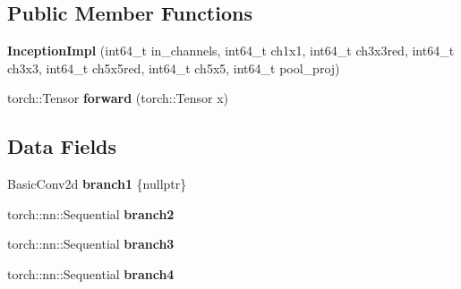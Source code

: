 \subsection*{Public Member Functions}
\begin{DoxyCompactItemize}
\item 
\mbox{\label{structvision_1_1models_1_1__googlenetimpl_1_1InceptionImpl_aa8705f8aaf53728f41070e9298b4fdea}} 
{\bfseries Inception\+Impl} (int64\+\_\+t in\+\_\+channels, int64\+\_\+t ch1x1, int64\+\_\+t ch3x3red, int64\+\_\+t ch3x3, int64\+\_\+t ch5x5red, int64\+\_\+t ch5x5, int64\+\_\+t pool\+\_\+proj)
\item 
\mbox{\label{structvision_1_1models_1_1__googlenetimpl_1_1InceptionImpl_a68019900b5a8935acadbc2ea42a9f42e}} 
torch\+::\+Tensor {\bfseries forward} (torch\+::\+Tensor x)
\end{DoxyCompactItemize}
\subsection*{Data Fields}
\begin{DoxyCompactItemize}
\item 
\mbox{\label{structvision_1_1models_1_1__googlenetimpl_1_1InceptionImpl_a5e50a0742d94c9fca281900ce4d98659}} 
Basic\+Conv2d {\bfseries branch1} \{nullptr\}
\item 
\mbox{\label{structvision_1_1models_1_1__googlenetimpl_1_1InceptionImpl_aaad65efe9d6ecd22ae13c9d7a674185c}} 
torch\+::nn\+::\+Sequential {\bfseries branch2}
\item 
\mbox{\label{structvision_1_1models_1_1__googlenetimpl_1_1InceptionImpl_a5294a132ff41050972ccc84ec651e8dc}} 
torch\+::nn\+::\+Sequential {\bfseries branch3}
\item 
\mbox{\label{structvision_1_1models_1_1__googlenetimpl_1_1InceptionImpl_a1ae67afcc3b48c91ffb88462b368ade8}} 
torch\+::nn\+::\+Sequential {\bfseries branch4}
\end{DoxyCompactItemize}



